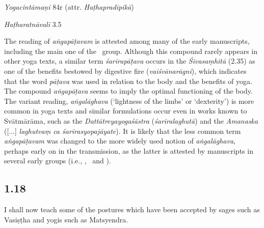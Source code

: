 \begin{ekdosis}
\begin{testimonia}[hp01_017]
\emph{Yogacintāmaṇi} 84r (attr. \emph{Haṭhapradīpikā})

\begin{versinnote}
\end{versinnote}

\emph{Haṭharatnāvalī} 3.5

\begin{versinnote}
\end{versinnote}

\end{testimonia}

\begin{philcomm}[hp01_017]        
The reading of \emph{aṅgapāṭavam} is attested among many of the early manuscripts, including the main one of the \textalpha\ group. Although this compound rarely appears in other yoga texts, a similar term \emph{śarīrapāṭava} occurs in the \emph{Śivasaṃhitā} (2.35) as one of the benefits bestowed by digestive fire (\emph{vaiśvānarāgni}), which indicates that the word \emph{pāṭava} was used in relation to the body and the benefits of yoga. The compound \emph{aṅgapāṭava} seems to imply the optimal functioning of the body. The variant reading, \emph{aṅgalāghava} (‘lightness of the limbs’ or ‘dexterity’) is more common in yoga texts and similar formulations occur even in works known to Svātmārāma, such as the \emph{Dattātreyayogaśāstra} (\emph{śarīralaghutā}) and the \textit{Amanaska} ([...] \emph{laghutvaṃ ca śarīrasyopajāyate}). It is likely that the less common term \emph{aṅgapāṭavam} was changed to the more widely used notion of \emph{aṅgalāghava}, perhaps early on in the transmission, as the latter is attested by manuscripts in several early groups (i.e., \textbeta, \textgamma\ and \textdelta).
\end{philcomm}

\subsection*{1.18}
\begin{translation}[hp01_018]
I shall now teach some of the postures which have been accepted by sages  such as Vasiṣṭha and yogis such as Matsyendra.
\end{translation}


\end{ekdosis}
